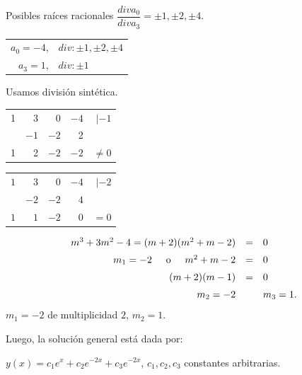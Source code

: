 \documentclass{beamer}
\begin{document}
\begin{frame}[t]
	\begin{exampleblock}{}
		Posibles raíces racionales \(\dfrac{div a_0}{div a_3} = \pm 1, \pm 2, \pm 4\).
		\begin{table}[hbtp!]
			\centering
			\begin{tabular}{rl}
				\(a_0 = -4\), & \(div: \pm 1, \pm 2, \pm 4\) \\
				\(a_3 = 1\), & \(div: \pm 1\)
			\end{tabular}
		\end{table}
		Usamos división sintética.\\
		\begin{minipage}{0.5\linewidth}
			\begin{tabular}{*{5}{r}}
				1 & 3 & 0 & \(-4\) & \underline{\(|-1\)} \\
				& \(-1\) & \(-2\) & 2 & \\ \hline 
				1 & 2 & \(-2\) & \(-2\) & \(\ne 0\)
			\end{tabular}
		\end{minipage}
		\begin{minipage}{0.4\linewidth}
			\begin{tabular}{*{5}{r}}
				\(1\) & \(3\) & \(0\) & \(-4\) & \underline{\(|-2\)} \\
				& \(-2\) & \(-2\) & \(4\) & \\ \hline
				\(1\) & \(1\) & \(-2\) & \(0\) & \(=0\)
			\end{tabular}
		\end{minipage}
		\[
			\begin{array}{rcl}
				m^3+3m^2-4 = (m+2) (m^2+m-2) & = & 0 \\[2mm]
				m_1=-2 \hspace{5mm} \mbox{o} \hspace{5mm} m^2+m-2 & = & 0 \\[2mm]
				(m+2) (m-1) & = & 0 \\[2mm]
				m_2 = -2 && m_3 = 1.
			\end{array} \vspace{-3mm}
		\]
		\(m_1=-2\) de multiplicidad \(2\), \(m_2=1\).
	\end{exampleblock}
\end{frame}

\begin{frame}[t]
	\begin{exampleblock}{}
		Luego, la solución general está dada por:
		\begin{center}
			\color{red} \underline{\color{black} \(y(x) = c_1e^x+c_2e^{-2x} + c_3e^{-2x}\)}\color{black}, \(c_1,c_2,c_3\) constantes arbitrarias.
		\end{center}
	\end{exampleblock}
\end{frame}

\end{document}
